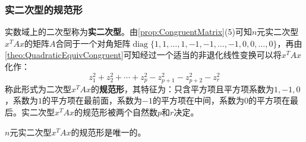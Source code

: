 \subsubsection{实二次型的规范形}
\begin{definition}
	实数域上的二次型称为\textbf{实二次型}。由\cref{prop:CongruentMatrix}(5)可知$n$元实二次型$x^TAx$的矩阵$A$合同于一个对角矩阵$\operatorname{diag}\{1,1,\dots,1,-1,-1,\dots,-1,0,0,\dots,0\}$，再由\cref{theo:QuadraticEquivCongruent}可知经过一个适当的非退化线性变换可以将$x^TAx$化作：
	\begin{equation*}
		z_1^2+z_2^2+\cdots+z_p^2-z_{p+1}^2-z_{p+2}^2-z_r^2
	\end{equation*}
	称此形式为二次型$x^TAx$的\textbf{规范形}，其特征为：只含平方项且平方项系数为$1,-1,0$，系数为$1$的平方项在最前面，系数为$-1$的平方项在中间，系数为$0$的平方项在最后。实二次型$x^TAx$的规范形被两个自然数$p$和$r$决定。
\end{definition}
\begin{theorem}
	\label{theo:Sylvester'sLawOfInertia}
	$n$元实二次型$x^TAx$的规范形是唯一的。
\end{theorem}
